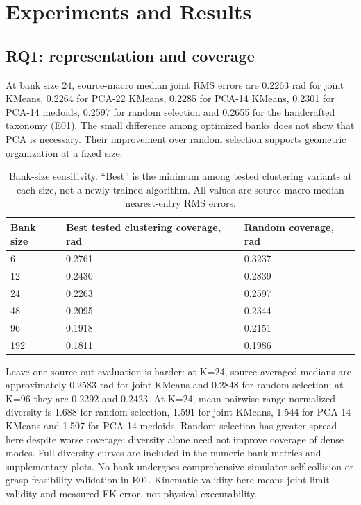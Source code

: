 \documentclass[10pt,twocolumn]{article}
\begin{document}
\section{Experiments and Results}

\subsection{RQ1: representation and coverage}

At bank size 24, source-macro median joint RMS errors are 0.2263 rad for joint KMeans, 0.2264 for PCA-22 KMeans, 0.2285 for PCA-14 KMeans, 0.2301 for PCA-14 medoids, 0.2597 for random selection and 0.2655 for the handcrafted taxonomy (E01). The small difference among optimized banks does not show that PCA is necessary. Their improvement over random selection supports geometric organization at a fixed size.

\begin{table}[t]
\small
\begin{tabularx}{\textwidth}{@{}lXX@{}}
\toprule
Bank size & Best tested clustering coverage, rad & Random coverage, rad \\
\midrule
6 & 0.2761 & 0.3237 \\
12 & 0.2430 & 0.2839 \\
24 & 0.2263 & 0.2597 \\
48 & 0.2095 & 0.2344 \\
96 & 0.1918 & 0.2151 \\
192 & 0.1811 & 0.1986 \\
\bottomrule
\end{tabularx}
\caption{Bank-size sensitivity. ``Best'' is the minimum among tested clustering variants at each size, not a newly trained algorithm. All values are source-macro median nearest-entry RMS errors.}
\end{table}

Leave-one-source-out evaluation is harder: at K=24, source-averaged medians are approximately 0.2583 rad for joint KMeans and 0.2848 for random selection; at K=96 they are 0.2292 and 0.2423. At K=24, mean pairwise range-normalized diversity is 1.688 for random selection, 1.591 for joint KMeans, 1.544 for PCA-14 KMeans and 1.507 for PCA-14 medoids. Random selection has greater spread here despite worse coverage: diversity alone need not improve coverage of dense modes. Full diversity curves are included in the numeric bank metrics and supplementary plots. No bank undergoes comprehensive simulator self-collision or grasp feasibility validation in E01. Kinematic validity here means joint-limit validity and measured FK error, not physical executability.
\end{document}
